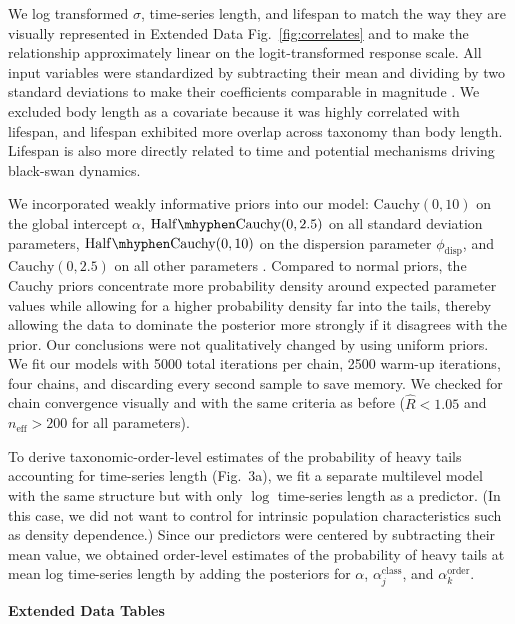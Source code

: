 We log transformed \(\sigma\), time-series length, and lifespan to match the way they are visually represented in Extended Data Fig.~\ref{fig:correlates} and to make the relationship approximately linear on the logit-transformed response scale. All input variables were standardized by subtracting their mean and dividing by two standard deviations to make their coefficients comparable in magnitude \cite{gelman2008c}. We excluded body length as a covariate because it was highly correlated with lifespan, and lifespan exhibited more overlap across taxonomy than body length. Lifespan is also more directly related to time and potential mechanisms driving black-swan dynamics.

We incorporated weakly informative priors into our model: \(\mathrm{Cauchy}(0, 10)\) on the global intercept \(\alpha\), \(\mathrm{Half\mhyphen Cauchy}(0, 2.5)\) on all standard deviation parameters, \(\mathrm{Half\mhyphen Cauchy}(0, 10)\) on the dispersion parameter \(\phi_\mathrm{disp}\), and \(\mathrm{Cauchy}(0, 2.5)\) on all other parameters \cite{gelman2006c, gelman2008d}. Compared to normal priors, the Cauchy priors concentrate more probability density around expected parameter values while allowing for a higher probability density far into the tails, thereby allowing the data to dominate the posterior more strongly if it disagrees with the prior. Our conclusions were not qualitatively changed by using uniform priors. We fit our models with 5000 total iterations per chain, 2500 warm-up iterations, four chains, and discarding every second sample to save memory. We checked for chain convergence visually and with the same criteria as before (\(\widehat{R} < 1.05\) and \(n_\mathrm{eff} >200\) for all parameters).

To derive taxonomic-order-level estimates of the probability of heavy tails accounting for time-series length (Fig.~3a), we fit a separate multilevel model with the same structure but with only \(\log\) time-series length as a predictor. (In this case, we did not want to control for intrinsic population characteristics such as density dependence.) Since our predictors were centered by subtracting their mean value, we obtained order-level estimates of the probability of heavy tails at mean log time-series length by adding the posteriors for \(\alpha\), \(\alpha^\mathrm{class}_j\), and \(\alpha^\mathrm{order}_k\).

\clearpage

\textbf{Extended Data Tables}

\newenvironment{helvetica}{\fontfamily{phv}\selectfont}{\par}

